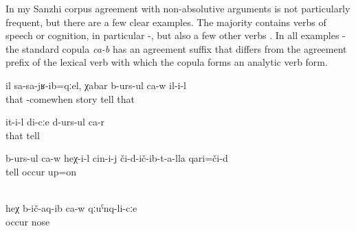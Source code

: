 In my Sanzhi corpus agreement with non-absolutive arguments is not particularly frequent, but there are a few clear examples. The majority contains verbs of speech or cognition, in particular   -, but also a few other verbs . In all examples - the standard copula \textit{ca-b} has an agreement suffix that differs from the agreement prefix of the lexical verb with which the copula forms an analytic verb form.
%
\begin{exe}
	\ex	\label{ex:when he came home, he was talking.}
	\gll	il	sa-sa-jʁ-ib=qːel, χabar	b-urs-ul	ca-w	il-i-l\\
		that	-comewhen	story	tell		that\\
	\glt	{}

	\ex	\label{ex:‎‎She is telling stories, she says to me}
	\gll	it-i-l	di-cːe	d-urs-ul	ca-r\\
		that		tell	\\
	\glt	{}

	\ex	\label{ex:‎‎He is telling about what he experienced}
	\gll	b-urs-ul	ca-w	heχ-i-l	cin-i-j	či-d-ič-ib-t-a-lla	qari=či-d\\
		tell				occur	up=on\\
	\glt	{}

	\\	\label{ex:She put it on HIS nose}
	\gll	heχ	b-ič-aq-ib	ca-w	qːuˁnq-li-cːe\\
			occur		nose\\
	\glt	{} 
\end{exe}

